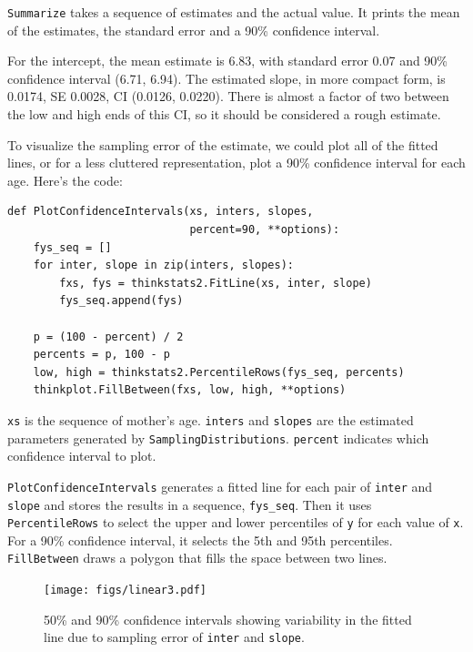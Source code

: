 \documentclass[12pt]{book}
\theoremstyle{exercise}
\begin{document}
{\tt Summarize} takes a sequence of estimates and the actual value.
It prints the mean of the estimates, the standard error and
a 90\% confidence interval.%
%

For the intercept, the mean estimate is 6.83, with standard error
0.07 and 90\% confidence interval (6.71, 6.94).  The estimated slope, in
more compact form, is 0.0174, SE 0.0028, CI (0.0126, 0.0220).
There is almost a factor of two between the low and high ends of
this CI, so it should be considered a rough estimate.


To visualize the sampling error of the estimate, we could plot
all of the fitted lines, or for a less cluttered representation,
plot a 90\% confidence interval for each age.  Here's the code:

\begin{verbatim}
def PlotConfidenceIntervals(xs, inters, slopes,
                            percent=90, **options):
    fys_seq = []
    for inter, slope in zip(inters, slopes):
        fxs, fys = thinkstats2.FitLine(xs, inter, slope)
        fys_seq.append(fys)

    p = (100 - percent) / 2
    percents = p, 100 - p
    low, high = thinkstats2.PercentileRows(fys_seq, percents)
    thinkplot.FillBetween(fxs, low, high, **options)
\end{verbatim}

{\tt xs} is the sequence of mother's age.  {\tt inters} and {\tt slopes}
are the estimated parameters generated by {\tt SamplingDistributions}.
{\tt percent} indicates which confidence interval to plot.

{\tt PlotConfidenceIntervals} generates a fitted line for each pair
of {\tt inter} and {\tt slope} and stores the results in a sequence,
\verb"fys_seq".  Then it uses {\tt PercentileRows} to select the
upper and lower percentiles of {\tt y} for each value of {\tt x}.
For a 90\% confidence interval, it selects the 5th and 95th percentiles.
{\tt FillBetween} draws a polygon that fills the space between two
lines.%
%

\begin{figure}
\centerline{\texttt{[image: figs/linear3.pdf]}}
\caption{50\% and 90\% confidence intervals showing variability in the
  fitted line due to sampling error of {\tt inter} and {\tt slope}.}%
\label{linear3}
\end{figure}
\end{document}
